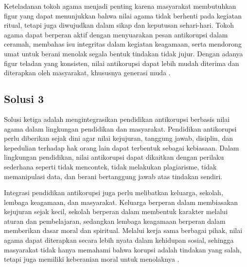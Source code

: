      Keteladanan tokoh agama menjadi penting karena masyarakat membutuhkan figur yang dapat menunjukkan bahwa nilai agama tidak berhenti pada kegiatan ritual, tetapi juga diwujudkan dalam sikap dan keputusan sehari-hari. Tokoh agama dapat berperan aktif dengan menyuarakan pesan antikorupsi dalam ceramah, membahas isu integritas dalam kegiatan keagamaan, serta mendorong umat untuk berani menolak segala bentuk tindakan tidak jujur. Dengan adanya figur teladan yang konsisten, nilai antikorupsi dapat lebih mudah diterima dan diterapkan oleh masyarakat, khususnya generasi muda \citep{siagian2025,zahron2026}.

        
\subsection{Solusi 3}
    Solusi ketiga adalah mengintegrasikan pendidikan antikorupsi berbasis nilai agama dalam lingkungan pendidikan dan masyarakat. Pendidikan antikorupsi perlu diberikan sejak dini agar nilai kejujuran, tanggung jawab, disiplin, dan kepedulian terhadap hak orang lain dapat terbentuk sebagai kebiasaan. Dalam lingkungan pendidikan, nilai antikorupsi dapat dikaitkan dengan perilaku sederhana seperti tidak mencontek, tidak melakukan plagiarisme, tidak memanipulasi data, dan berani bertanggung jawab atas tindakan sendiri.

    Integrasi pendidikan antikorupsi juga perlu melibatkan keluarga, sekolah, lembaga keagamaan, dan masyarakat. Keluarga berperan dalam membiasakan kejujuran sejak kecil, sekolah berperan dalam membentuk karakter melalui aturan dan pembelajaran, sedangkan lembaga keagamaan berperan dalam memberikan dasar moral dan spiritual. Melalui kerja sama berbagai pihak, nilai agama dapat diterapkan secara lebih nyata dalam kehidupan sosial, sehingga masyarakat tidak hanya memahami bahwa korupsi adalah tindakan yang salah, tetapi juga memiliki keberanian moral untuk menolaknya \citep{devina2026,nuruddin2024}.
